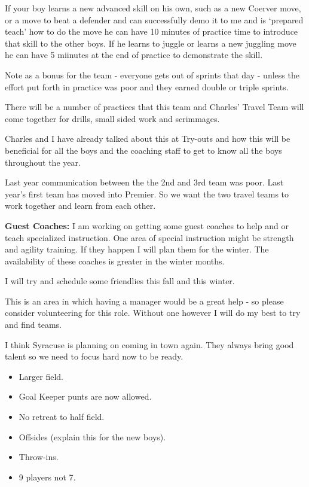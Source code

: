 \documentclass[10pt,letterpaper]{article}
\newenvironment{agendablock}[1]{%
    \tcolorbox[beamer,%
    noparskip,breakable,
    colback=LightGray,colframe=Black,%
    colbacklower=Gray!75!LightGray,%
    title=#1]}%
    {\endtcolorbox}
\newenvironment{evenBlock}[1]{%
    \tcolorbox[beamer,%
    noparskip,breakable,
    colback=LightGreen,colframe=DarkGreen,%
    colbacklower=LimeGreen!75!LightGreen,%
    title=#1]}%
    {\endtcolorbox}
\begin{document}
\begin{agendablock}{Skill Building Encouragement and Leadership}
If your boy learns a new advanced skill on his own, such as a new Coerver move, or a move to beat a defender and can successfully demo it to me and is `prepared teach' how to do the move he can have 10 minutes of practice time to introduce that skill to the other boys.  If he learns to juggle or learns a new juggling move he can have 5 miinutes at the end of practice to demonstrate the skill.

Note as a bonus for the team - everyone gets out of sprints that day - unless the effort put forth in practice was poor and they earned double or triple sprints.
\end{agendablock}

\begin{agendablock}{Practice Variations}
There will be a number of practices that this team and Charles' Travel Team will come together for drills, small sided work and scrimmages.

Charles and I have already talked about this at Try-outs and how this will be beneficial for all the boys and the coaching staff to get to know all the boys throughout the year.

Last year communication between the the 2nd and 3rd team was poor.  Last year's first team has moved into Premier.  So we want the two travel teams to work together and learn from each other.

\textbf{Guest Coaches:}
I am working on getting some guest coaches to help and or teach specialized instruction.  One area of special instruction might be strength and agility training.  If they happen I will plan them for the winter.  The availability of these coaches is greater in the winter months.
\end{agendablock}

\begin{agendablock}{Friendly Scrimmages}
I will try and schedule some friendlies this fall and this winter.

This is an area in which having a manager would be a great help - so please consider volunteering for this role.
Without one however I will do my best to try and find teams.

I think Syracuse is planning on coming in town again.  They always bring good talent so we need to focus hard now to be ready.
\end{agendablock}

\begin{evenBlock}{U10 vs U11 Rule Changes}
    \begin{itemize}
        \item Larger field.
        \item Goal Keeper punts are now allowed.
        \item No retreat to half field.
        \item Offsides (explain this for the new boys).
        \item Throw-ins.
        \item 9 players not 7.
    \end{itemize}
\end{evenBlock}
\end{document}
